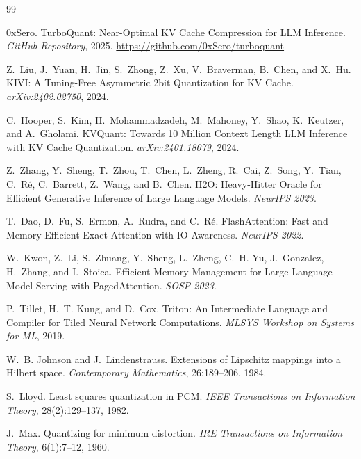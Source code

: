 \documentclass[10pt,twocolumn]{article}
\begin{document}

\begin{thebibliography}{99}

0xSero.
\newblock TurboQuant: Near-Optimal KV Cache Compression for LLM Inference.
\newblock \textit{GitHub Repository}, 2025.
\newblock \url{https://github.com/0xSero/turboquant}

Z.~Liu, J.~Yuan, H.~Jin, S.~Zhong, Z.~Xu, V.~Braverman, B.~Chen, and X.~Hu.
\newblock KIVI: A Tuning-Free Asymmetric 2bit Quantization for KV Cache.
\newblock \textit{arXiv:2402.02750}, 2024.

C.~Hooper, S.~Kim, H.~Mohammadzadeh, M.~Mahoney, Y.~Shao, K.~Keutzer, and A.~Gholami.
\newblock KVQuant: Towards 10 Million Context Length LLM Inference with KV Cache Quantization.
\newblock \textit{arXiv:2401.18079}, 2024.

Z.~Zhang, Y.~Sheng, T.~Zhou, T.~Chen, L.~Zheng, R.~Cai, Z.~Song, Y.~Tian, C.~Ré, C.~Barrett, Z.~Wang, and B.~Chen.
\newblock H2O: Heavy-Hitter Oracle for Efficient Generative Inference of Large Language Models.
\newblock \textit{NeurIPS 2023}.

T.~Dao, D.~Fu, S.~Ermon, A.~Rudra, and C.~Ré.
\newblock FlashAttention: Fast and Memory-Efficient Exact Attention with IO-Awareness.
\newblock \textit{NeurIPS 2022}.

W.~Kwon, Z.~Li, S.~Zhuang, Y.~Sheng, L.~Zheng, C.~H. Yu, J.~Gonzalez, H.~Zhang, and I.~Stoica.
\newblock Efficient Memory Management for Large Language Model Serving with PagedAttention.
\newblock \textit{SOSP 2023}.

P.~Tillet, H.~T. Kung, and D.~Cox.
\newblock Triton: An Intermediate Language and Compiler for Tiled Neural Network Computations.
\newblock \textit{MLSYS Workshop on Systems for ML}, 2019.

W.~B. Johnson and J.~Lindenstrauss.
\newblock Extensions of Lipschitz mappings into a Hilbert space.
\newblock \textit{Contemporary Mathematics}, 26:189--206, 1984.

S.~Lloyd.
\newblock Least squares quantization in PCM.
\newblock \textit{IEEE Transactions on Information Theory}, 28(2):129--137, 1982.

J.~Max.
\newblock Quantizing for minimum distortion.
\newblock \textit{IRE Transactions on Information Theory}, 6(1):7--12, 1960.


\end{thebibliography}
\end{document}
